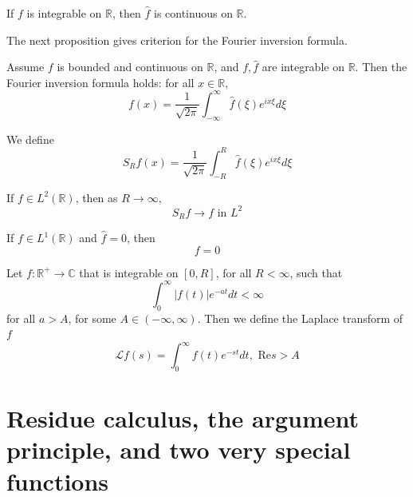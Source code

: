 \documentclass[openany]{book}
\newcommand{\R}{\mathbb{R}}
\newcommand{\C}{\mathbb{C}}
\begin{document}
\begin{prop}
    If $f$ is integrable on $\R$, then $\hat{f}$ is continuous on $\R$.
\end{prop}

The next proposition gives criterion for the Fourier inversion formula.
\begin{prop}
    Assume $f$ is bounded and continuous on $\R$, and $f,\hat{f}$ are integrable on $\R$. Then the Fourier inversion formula holds: for all $x\in\R$,
    \begin{equation*}
        f(x)=\frac{1}{\sqrt{2\pi}}\int_{-\infty}^\infty\hat{f}(\xi)e^{ix\xi}d\xi
    \end{equation*}
\end{prop}

We define 
\begin{equation*}
    S_Rf(x)=\frac{1}{\sqrt{2\pi}}\int_{-R}^R\hat{f}(\xi)e^{ix\xi}d\xi
\end{equation*}
\begin{prop}
    If $f\in L^2(\R)$, then as $R\to\infty$,
    \begin{equation*}
        S_Rf\to f \text{ in } L^2
    \end{equation*}
\end{prop}


\begin{prop}[uniqueness]
    If $f\in L^1(\R)$ and $\hat{f}=0$, then 
    \begin{equation*}
        f=0
    \end{equation*}
\end{prop}


\begin{defn}
    Let $f:\R^+\to\C$ that is integrable on $[0,R]$, for all $R<\infty$, such that 
    \begin{equation*}
        \int_0^\infty|f(t)|e^{-at}dt<\infty
    \end{equation*}
    for all $a>A$, for some $A\in(-\infty,\infty)$. Then we define the Laplace transform of $f$ 
    \begin{equation*}
        \mathcal{L}f(s)=\int_0^\infty f(t)e^{-st}dt, \text{ Re} s>A
    \end{equation*}
\end{defn}





\chapter{Residue calculus, the argument principle, and two very special
functions}
\end{document}
